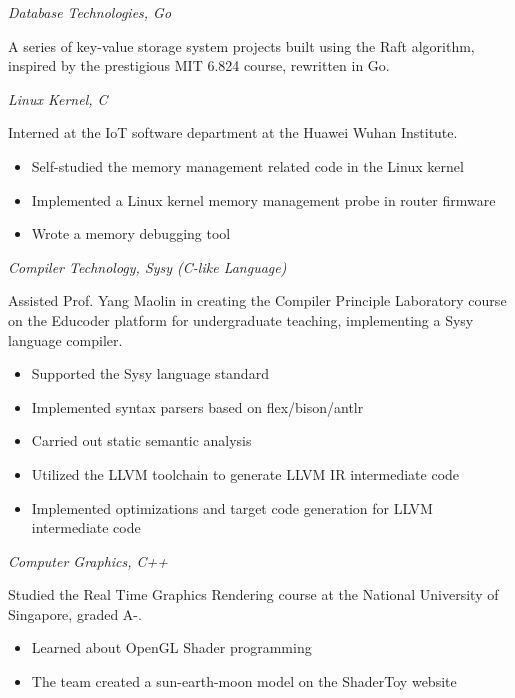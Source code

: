 \documentclass{uniquecv}
\begin{document}
\textit{Database Technologies, Go}
\vspace{0.4ex}

A series of key-value storage system projects built using the Raft algorithm, inspired by the prestigious MIT 6.824 course, rewritten in Go.



\textit{Linux Kernel, C}
\vspace{0.4ex}

Interned at the IoT software department at the Huawei Wuhan Institute.
\begin{itemize}
    \item Self-studied the memory management related code in the Linux kernel
    \item Implemented a Linux kernel memory management probe in router firmware
    \item Wrote a memory debugging tool
\end{itemize}

\textit{Compiler Technology, Sysy (C-like Language)}
\vspace{0.4ex}

Assisted Prof. Yang Maolin in creating the Compiler Principle Laboratory course on the Educoder platform for undergraduate teaching, implementing a Sysy language compiler.
\begin{itemize}
  \item Supported the Sysy language standard
  \item Implemented syntax parsers based on flex/bison/antlr
  \item Carried out static semantic analysis
  \item Utilized the LLVM toolchain to generate LLVM IR intermediate code
  \item Implemented optimizations and target code generation for LLVM intermediate code
\end{itemize}

\textit{Computer Graphics, C++}
\vspace{0.4ex}

Studied the Real Time Graphics Rendering course at the National University of Singapore, graded A-.
\begin{itemize}
    \item Learned about OpenGL Shader programming
    \item The team created a sun-earth-moon model on the ShaderToy website
\end{itemize}
\end{document}
